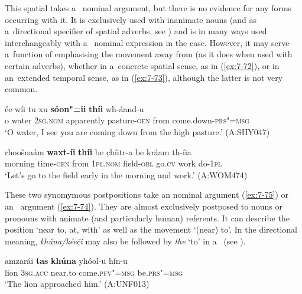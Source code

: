 \begin{exe}
 This spatial  takes a~ nominal argument, but there is no evidence for any  forms occurring with it. It is exclusively used with inanimate nouns (and as a~directional specifier of spatial adverbs, see ) and is in many ways used interchangeably with a~ nominal expression in the  case. However, it may serve a~function of emphasising the movement away from (as it does when used with certain adverbs), whether in a~concrete spatial sense, as in (\ref{ex:7-72}), or in an~extended temporal sense, as in (\ref{ex:7-73}), although the latter is not very common.

\begin{exe}
\ex
\label{ex:7-72}
\gll ée wíi tu xu \textbf{sóon"=ii} \textbf{thíi} wh-áand-u \\
o water \textsc{2sg.nom} apparently pasture-\textsc{gen} from  come.down-\textsc{prs"=msg}  \\
\glt `O water, I see you are coming down from the high pasture.' (A:SHY047)
\end{exe}
\begin{exe}
\ex
\label{ex:7-73}
\gll rhoošnaám \textbf{waxt-íi} \textbf{thíi} be c̣híitr-a be kráam th-íia  \\
morning  time-\textsc{gen} from \textsc{1pl.nom} field-\textsc{obl} go.\textsc{cv} work do-\textsc{1pl} \\
\glt `Let's go to the field early in the morning and work.' (A:WOM474)
\end{exe}

 These two synomymous postpositions take an  nominal argument (\ref{ex:7-75}) or an~  argument (\ref{ex:7-74}). They are almost exclusively postposed to nouns or pronouns with animate (and particularly human) referents. It can describe the position `near to, at, with' as well as the movement `(near) to'. In the directional meaning, \textit{khúna/kéeči} may also be followed by \textit{the} `to' in a~ (see ).


\begin{exe}
\ex
\label{ex:7-74}
\gll amzarái \textbf{tas} \textbf{khúna} yhóol-u hín-u \\
lion \textsc{3sg.acc} near.to come.\textsc{pfv"=msg } be.\textsc{prs"=msg} \\
\glt `The lion approached him.' (A:UNF013)
\end{exe}


\end{exe}
